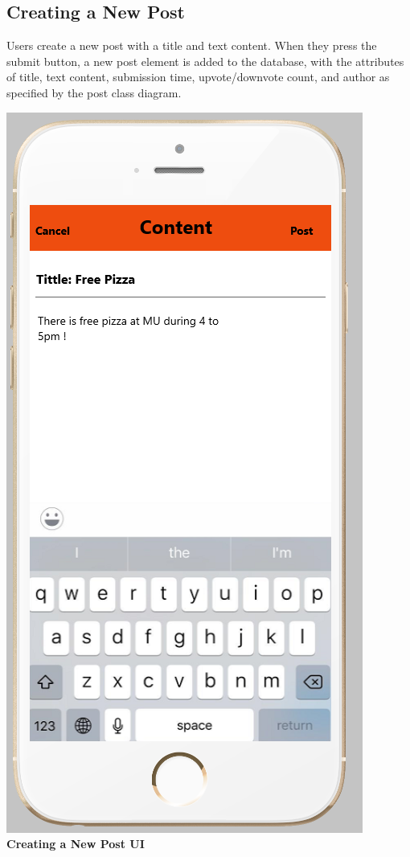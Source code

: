 \documentclass[12pt]{article}
\begin{document}
\subsection{Creating a New Post}
Users create a new post with a title and text content. When they press the submit button, a new post element is added to the database, with the attributes of title, text content, submission time, upvote/downvote count, and author as specified by the post class diagram.
\begin{center}
\includegraphics[scale=0.30]{img/ui/post}\linebreak
\textbf{Creating a New Post UI}
  \end{center}
\end{document}
